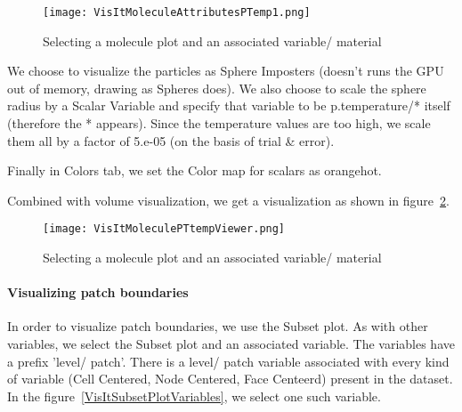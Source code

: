 \begin{figure}
  \center
  \texttt{[image: VisItMoleculeAttributesPTemp1.png]}
  \caption{Selecting a molecule plot and an associated variable/ material}
  \label{VisItMoleculeAttributesPTemp1}
\end{figure}

We choose to visualize the particles as Sphere Imposters (doesn't runs the GPU out of memory, drawing as Spheres does). We also choose to scale the sphere radius by a Scalar Variable and specify that variable to be p.temperature/* itself (therefore the * appears). Since the temperature values are too high, we scale them all by a factor of 5.e-05 (on the basis of trial \& error).

Finally in Colors tab, we set the Color map for scalars as orangehot.

Combined with volume visualization, we get a visualization as shown in figure~\ref{VisItMoleculePTtempViewer}.

\begin{figure}
  \center
  \texttt{[image: VisItMoleculePTtempViewer.png]}
  \caption{Selecting a molecule plot and an associated variable/ material}
  \label{VisItMoleculePTtempViewer}
\end{figure}

\paragraph{Visualizing patch boundaries}
In order to visualize patch boundaries, we use the Subset plot. As with other variables, we select the Subset plot and an associated variable. The variables have a prefix 'level/ patch'. There is a level/ patch variable associated with every kind of variable (Cell Centered, Node Centered, Face Centeerd) present in the dataset. In the figure~\ref{VisItSubsetPlotVariables}, we select one such variable.


